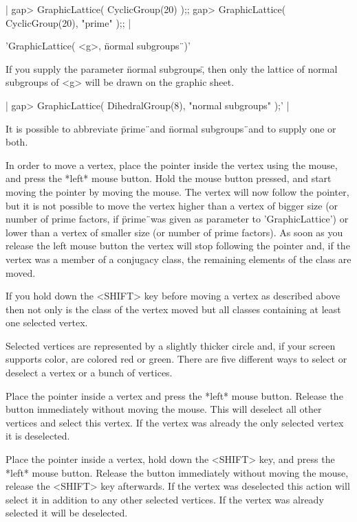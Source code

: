 |    gap> GraphicLattice( CyclicGroup(20) );;
    gap> GraphicLattice( CyclicGroup(20), "prime" );; |

'GraphicLattice( <g>, \"normal subgroups\"\ )'

If you supply the parameter  \"normal subgroups\", then only the  lattice
of normal subgroups of <g> will be drawn on the graphic sheet.

|    gap> GraphicLattice( DihedralGroup(8), "normal subgroups" );' |

It is possible to abbreviate \"prime\"\  and \"normal subgroups\"\ and to
supply one or both.


In order to move a vertex, place the  pointer inside the vertex using the
mouse, and press the *left* mouse button.  Hold the mouse button pressed,
and start moving  the pointer by moving  the mouse.  The  vertex will now
follow the pointer, but it is not possible to move the vertex higher than
a vertex  of bigger size  (or number of prime  factors, if \"prime\"\ was
given as parameter to 'GraphicLattice') or lower than a vertex of smaller
size (or number of prime factors).  As soon as you release the left mouse
button the vertex will stop following the pointer  and, if the vertex was
a member of a  conjugacy class, the remaining elements  of the class  are
moved.

If you hold  down  the <SHIFT> key before  moving  a vertex as  described
above then  not only is the  class  of the vertex   moved but all classes
containing at least one selected vertex.


Selected vertices are  represented by a slightly  thicker circle and,  if
your screen  supports color, are colored red   or green.  There  are five
different ways to select or deselect a vertex or a bunch of vertices.

Place the  pointer inside  a  vertex and press   the *left* mouse button.
Release   the button immediately   without  moving the  mouse.  This will
deselect all other vertices  and select this vertex.   If the vertex  was
already the only selected vertex it is deselected.

Place the  pointer inside a vertex, hold  down the <SHIFT> key, and press
the  *left* mouse button.   Release the button immediately without moving
the    mouse, release the   <SHIFT> key  afterwards.   If  the vertex was
deselected this action will  select it in  addition to any other selected
vertices. If the vertex was already selected it will be deselected.

